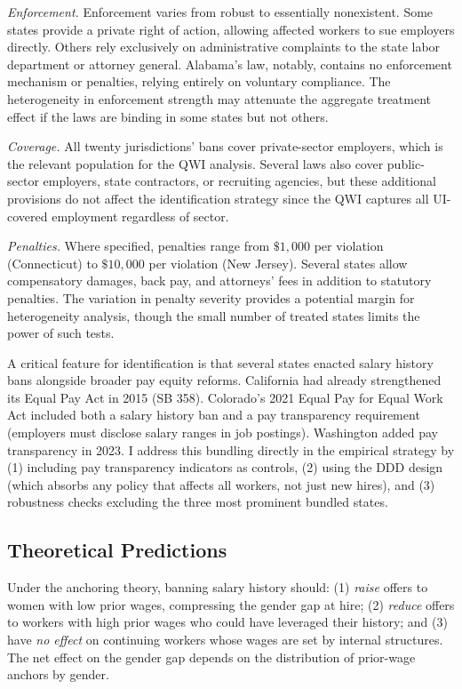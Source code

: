 \documentclass[12pt]{article}
\begin{document}
\textit{Enforcement.} Enforcement varies from robust to essentially nonexistent. Some states provide a private right of action, allowing affected workers to sue employers directly. Others rely exclusively on administrative complaints to the state labor department or attorney general. Alabama's law, notably, contains no enforcement mechanism or penalties, relying entirely on voluntary compliance. The heterogeneity in enforcement strength may attenuate the aggregate treatment effect if the laws are binding in some states but not others.

\textit{Coverage.} All twenty jurisdictions' bans cover private-sector employers, which is the relevant population for the QWI analysis. Several laws also cover public-sector employers, state contractors, or recruiting agencies, but these additional provisions do not affect the identification strategy since the QWI captures all UI-covered employment regardless of sector.

\textit{Penalties.} Where specified, penalties range from $\$1{,}000$ per violation (Connecticut) to $\$10{,}000$ per violation (New Jersey). Several states allow compensatory damages, back pay, and attorneys' fees in addition to statutory penalties. The variation in penalty severity provides a potential margin for heterogeneity analysis, though the small number of treated states limits the power of such tests.

A critical feature for identification is that several states enacted salary history bans alongside broader pay equity reforms. California had already strengthened its Equal Pay Act in 2015 (SB 358). Colorado's 2021 Equal Pay for Equal Work Act included both a salary history ban and a pay transparency requirement (employers must disclose salary ranges in job postings). Washington added pay transparency in 2023. I address this bundling directly in the empirical strategy by (1) including pay transparency indicators as controls, (2) using the DDD design (which absorbs any policy that affects all workers, not just new hires), and (3) robustness checks excluding the three most prominent bundled states.

\subsection{Theoretical Predictions}

Under the anchoring theory, banning salary history should: (1) \textit{raise} offers to women with low prior wages, compressing the gender gap at hire; (2) \textit{reduce} offers to workers with high prior wages who could have leveraged their history; and (3) have \textit{no effect} on continuing workers whose wages are set by internal structures. The net effect on the gender gap depends on the distribution of prior-wage anchors by gender.
\end{document}
